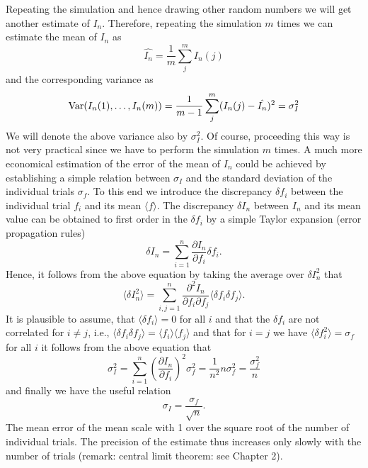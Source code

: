 Repeating the 
simulation and hence drawing other random numbers we will get another
estimate of $I_n$. Therefore, repeating the simulation $m$ times 
we can estimate the mean of $I_n$ as
\begin{equation}
\hat{I_n} = \frac{1}{m} \sum_j^m I_n(j)
\end{equation}
and the corresponding variance as
\begin{equation}
{\rm Var}(I_n(1), \ldots, I_n(m)) = 
\frac{1}{m-1} \sum_j^m (I_n(j) - \hat{I_n})^2 = \sigma_I^2
\end{equation}
We will denote the above variance also by $\sigma_I^2$.
Of course, proceeding this way is not very practical since we
have to perform the simulation $m$ times. A much more economical
estimation of the error of the mean of $I_n$ could be achieved by 
establishing a simple relation between $\sigma_I$ and the standard 
deviation of the individual trials $\sigma_f$. To this end we 
introduce the discrepancy $\delta f_i$ between the
individual trial $f_i$ and its mean $\langle f \rangle$. The 
discrepancy $\delta I_n$ between $I_n$ and its mean value can be
obtained to first order in the $\delta f_i$ by a simple Taylor 
expansion (error propagation rules)
\begin{equation}
\delta I_n = \sum_{i=1}^n \frac{\partial I_n}{\partial f_i} \delta 
f_i.
\end{equation}
Hence, it follows from the above equation by taking the average over
$\delta I_n^2$ that
\begin{equation}
\langle \delta I_n^2 \rangle = \sum_{i,j=1}^{n}
    \frac{\partial^2 I_n}{\partial f_i \partial f_j} 
     \langle \delta f_i \delta f_j \rangle.
\end{equation}
It is plausible to assume, that 
$\langle \delta f_i \rangle = 0$
for all $i$ and that the $\delta f_i$ are not correlated
for $i \neq j$, i.e.,
$\langle \delta f_i \delta f_j \rangle = \langle f_i \rangle \langle f_j \rangle$
and that for $i=j$ we have $\langle \delta f_i^2 \rangle = \sigma_f$ 
for all $i$ it follows from the above equation that
\begin{equation}
\sigma_I^2 = \sum_{i=1}^n \left(
      \frac{\partial I_n}{\partial f_i} \right)^2 \sigma_f^2
      = \frac{1}{n^2} n \sigma_f^2 = \frac{\sigma_f^2}{n}
\end{equation}
and finally we have the useful relation
\begin{equation}
\sigma_I = \frac{\sigma_f}{\sqrt{n}}.
\end{equation}
The mean error of the mean scale with 1 over the square root of 
the number of individual trials. The precision of the estimate 
thus increases only slowly with the number of trials (remark: central
limit theorem: see Chapter 2).

